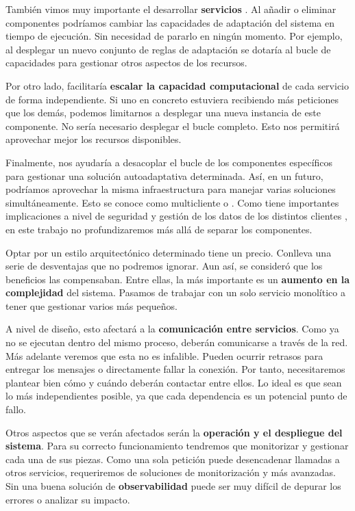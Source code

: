 También vimos muy importante el desarrollar \textbf{servicios }. Al añadir o eliminar componentes podríamos cambiar las capacidades de adaptación del sistema en tiempo de ejecución. Sin necesidad de pararlo en ningún momento. Por ejemplo, al desplegar un nuevo conjunto de reglas de adaptación se dotaría al bucle de capacidades para gestionar otros aspectos de los recursos.

Por otro lado, facilitaría \textbf{escalar la capacidad computacional} de cada servicio de forma independiente. Si uno en concreto estuviera recibiendo más peticiones que los demás, podemos limitarnos a desplegar una nueva instancia de este componente. No sería necesario desplegar el bucle completo. Esto nos permitirá aprovechar mejor los recursos disponibles.

Finalmente, nos ayudaría a desacoplar el bucle de los componentes específicos para gestionar una solución autoadaptativa determinada. Así, en un futuro, podríamos aprovechar la misma infraestructura para manejar varias soluciones simultáneamente. Esto se conoce como multicliente o \textbf{}. Como tiene importantes implicaciones a nivel de seguridad y gestión de los datos de los distintos clientes \cite{aljahdaliMultitenancyCloudComputing2014}, en este trabajo no profundizaremos más allá de separar los componentes.

Optar por un estilo arquitectónico determinado tiene un precio. Conlleva una serie de desventajas que no podremos ignorar. Aun así, se consideró que los beneficios las compensaban. Entre ellas, la más importante es un \textbf{aumento en la complejidad} del sistema. \cite{newmanBuildingMicroservicesDesigning2021} Pasamos de trabajar con un solo servicio monolítico a tener que gestionar varios más pequeños.

A nivel de diseño, esto afectará a la \textbf{comunicación entre servicios}. Como ya no se ejecutan dentro del mismo proceso, deberán comunicarse a través de la red. Más adelante veremos que esta no es infalible. \cite{jausovecFallaciesDistributedSystems2020} Pueden ocurrir retrasos para entregar los mensajes o directamente fallar la conexión. Por tanto, necesitaremos plantear bien cómo y cuándo deberán contactar entre ellos. Lo ideal es que sean lo más independientes posible, ya que cada dependencia es un potencial punto de fallo.

Otros aspectos que se verán afectados serán la \textbf{operación y el despliegue del sistema}. Para su correcto funcionamiento tendremos que monitorizar y gestionar cada una de sus piezas. Como una sola petición puede desencadenar llamadas a otros servicios, requeriremos de soluciones de monitorización y  más avanzadas. \cite{parkerDistributedTracingPractice2020} Sin una buena solución de \textbf{observabilidad} puede ser muy difícil de depurar los errores o analizar su impacto.


